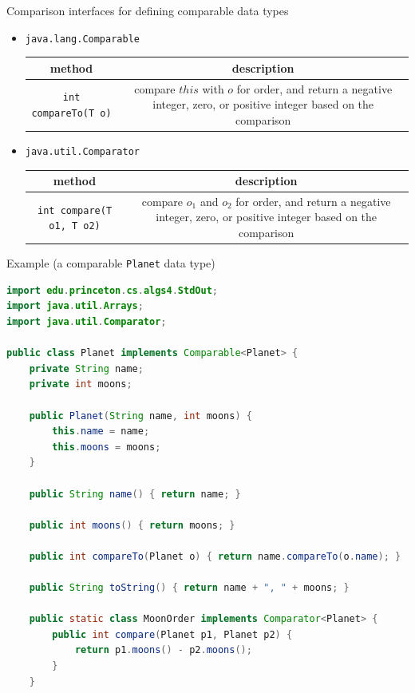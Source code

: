 \documentclass[8pt,a4paper,compress]{beamer}
\begin{document}
\begin{frame}[fragile]
\pause

Comparison interfaces for defining comparable data types
\begin{itemize}
\pause
\item \lstinline{java.lang.Comparable}
\begin{center}
\begin{tabular}{cc}
method & description \\ \hline
\lstinline$int compareTo(T o)$ & \makecell{compare $this$ with $o$ for order, and return a negative \\ integer, zero, or positive integer based on the comparison}
\end{tabular} 
\end{center}

\pause
\item \lstinline{java.util.Comparator}
\begin{center}
\begin{tabular}{cc}
method & description \\ \hline
\lstinline$int compare(T o1, T o2)$ & \makecell{compare $o_1$ and $o_2$ for order, and return a negative \\ integer, zero, or positive integer based on \\ the comparison}
\end{tabular} 
\end{center}
\end{itemize}
\end{frame}

\begin{frame}[fragile]
\pause

Example (a comparable \lstinline{Planet} data type)

\smallskip

\begin{lstlisting}[language=Java,style=focusin]
import edu.princeton.cs.algs4.StdOut;
import java.util.Arrays;
import java.util.Comparator;

public class Planet implements Comparable<Planet> {
    private String name;
    private int moons;

    public Planet(String name, int moons) {
        this.name = name;
        this.moons = moons;
    }
    
    public String name() { return name; }

    public int moons() { return moons; }

    public int compareTo(Planet o) { return name.compareTo(o.name); }
    
    public String toString() { return name + ", " + moons; }

    public static class MoonOrder implements Comparator<Planet> {
        public int compare(Planet p1, Planet p2) {
            return p1.moons() - p2.moons();
        }
    }
\end{lstlisting}
\end{frame}
\end{document}
